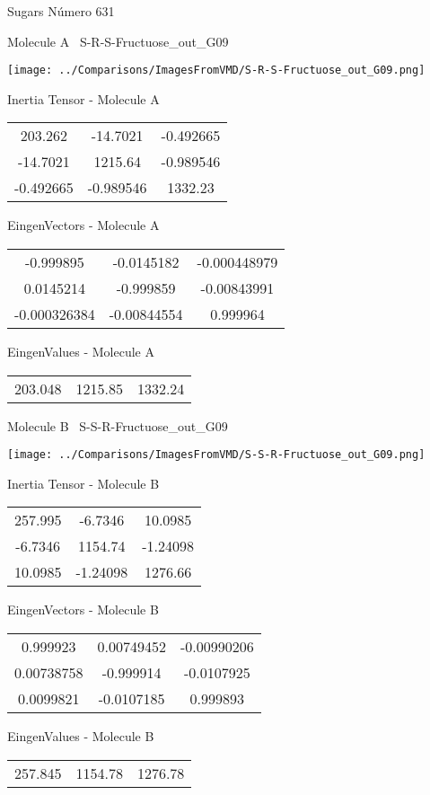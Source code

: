 \vtab[-3cm]
\begin{center}
{\large Sugars \tab Número 631}
\end{center}
\begin{multicols}{2}
\begin{center}

Molecule A \
S-R-S-Fructuose\_out\_G09

\texttt{[image: ../Comparisons/ImagesFromVMD/S-R-S-Fructuose\_out\_G09.png]}

Inertia Tensor - Molecule A \\
\begin{tabular}{|c c c|}
203.262	 & 	-14.7021	 & 	-0.492665	 \\
-14.7021	 & 	1215.64	 & 	-0.989546	 \\
-0.492665	 & 	-0.989546	 & 	1332.23
\end{tabular}

\vtab
 EingenVectors - Molecule A     \\
\begin{tabular}{|c c c|}
-0.999895	 & 	-0.0145182	 & 	-0.000448979	 \\
0.0145214	 & 	-0.999859	 & 	-0.00843991	 \\
-0.000326384	 & 	-0.00844554	 & 	0.999964
\end{tabular}

\vtab
 EingenValues - Molecule A     \\
\begin{tabular}{|c c c|}
203.048	 & 	1215.85	 & 	1332.24	 \\
\end{tabular}
\columnbreak

Molecule B \
S-S-R-Fructuose\_out\_G09

\texttt{[image: ../Comparisons/ImagesFromVMD/S-S-R-Fructuose\_out\_G09.png]}

Inertia Tensor - Molecule B \\
\begin{tabular}{|c c c|}
257.995	 & 	-6.7346	 & 	10.0985	 \\
-6.7346	 & 	1154.74	 & 	-1.24098	 \\
10.0985	 & 	-1.24098	 & 	1276.66
\end{tabular}

\vtab
 EingenVectors - Molecule B     \\
\begin{tabular}{|c c c|}
0.999923	 & 	0.00749452	 & 	-0.00990206	 \\
0.00738758	 & 	-0.999914	 & 	-0.0107925	 \\
0.0099821	 & 	-0.0107185	 & 	0.999893
\end{tabular}

\vtab
 EingenValues - Molecule B     \\
\begin{tabular}{|c c c|}
257.845	 & 	1154.78	 & 	1276.78	 \\
\end{tabular}

\end{center}
\end{multicols}

